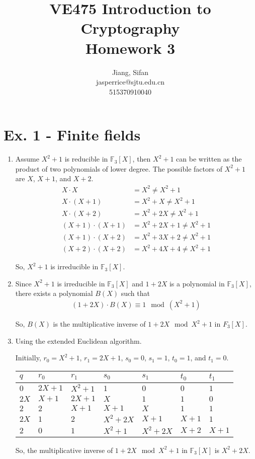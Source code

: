 \documentclass[11pt,a4paper]{article}
\title{
	VE475 Introduction to Cryptography \\
	Homework 3
}
\author{
	Jiang, Sifan\\
	jasperrice@sjtu.edu.cn\\
	515370910040
}
\begin{document}
\maketitle


\section*{Ex. 1 - Finite fields}
\begin{enumerate}
	\item Assume $X^{2} + 1$ is reducible in $\mathbb{F}_{3}[X]$, then $X^{2} + 1$ can be written as the product of two polynomials of lower degree. The possible factors of $X^{2} + 1$ are $X$, $X + 1$, and $X + 2$.
		\begin{align*}
			X \cdot X &= X^{2} \neq X^{2} + 1 \\
			X \cdot (X + 1) &= X^{2} + X \neq X^{2} + 1 \\
			X \cdot (X + 2) &= X^{2} + 2X \neq X^{2} + 1 \\
			(X + 1) \cdot (X + 1) &= X^{2} + 2X + 1 \neq X^{2} + 1 \\
			(X + 1) \cdot (X + 2) &= X^{2} + 3X + 2 \neq X^{2} + 1 \\
			(X + 2) \cdot (X + 2) &= X^{2} + 4X + 4 \neq X^{2} + 1
		\end{align*}
	\par So, $X^{2} + 1$ is irreducible in $\mathbb{F}_{3}[X]$.

	\item Since $X^{2} + 1$ is irreducible in $\mathbb{F}_{3}[X]$ and $1 + 2X$ is a polynomial in $\mathbb{F}_{3}[X]$, there exists a polynomial $B(X)$ such that
		\begin{align*}
			(1 + 2X) \cdot B(X) \equiv 1 \mod (X^{2} + 1)
		\end{align*}
	\par So, $B(X)$ is the multiplicative inverse of $1 + 2X \mod X^{2} + 1$ in $F_{3}[X]$.
	
	\item Using the extended Euclidean algorithm.
	\par Initially, $r_{0}=X^{2}+1$, $r_{1}=2X+1$, $s_{0} = 0$, $s_{1} = 1$, $t_{0} = 1$, and $t_{1} = 0$.
		\begin{table}[!ht]
			\centering
			\begin{tabular}{lll|llll}
					$q$ & $r_{0}$ & $r_{1}$ & $s_{0}$ & $s_{1}$ & $t_{0}$ & $t_{1}$ \\
					\hline
					$0$ & $2X+1$ & $X^{2}+1$ & $1$ & $0$ & $0$ & $1$ \\
					$2X$ & $X+1$ & $2X+1$ & $X$ & $1$ & $1$ & $0$ \\
					$2$ & $2$ & $X+1$ & $X+1$ & $X$ & $1$ & $1$ \\
					$2X$ & $1$ & $2$ & $X^{2}+2X$ & $X+1$ & $X+1$ & $1$ \\
					$2$ & $0$ & $1$ & $X^{2}+1$ & $X^{2}+2X$ & $X+2$ & $X+1$
			\end{tabular}
		\end{table}
	\par So, the multiplicative inverse of $1+2X \mod X^{2}+1$ in $\mathbb{F}_{3}[X]$ is $X^{2}+2X$.
\end{enumerate}
\end{document}

